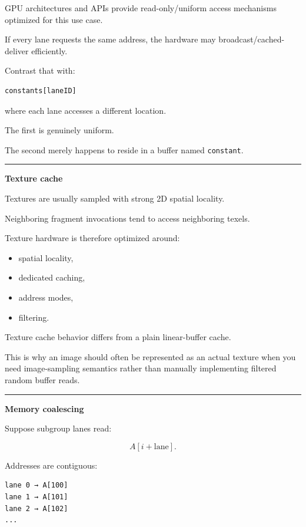 GPU architectures and APIs provide read-only/uniform access mechanisms optimized for this use case.

If every lane requests the same address, the hardware may broadcast/cached-deliver efficiently.

Contrast that with:

\protect{}\label{7e3tbt}%
\begin{verbatim}
constants[laneID]
\end{verbatim}

where each lane accesses a different location.

The first is genuinely uniform.

The second merely happens to reside in a buffer named \texttt{constant}.

\begin{center}\rule{0.5\linewidth}{0.5pt}\end{center}

\textbf{Texture cache}

Textures are usually sampled with strong 2D spatial locality.

Neighboring fragment invocations tend to access neighboring texels.

Texture hardware is therefore optimized around:

\begin{itemize}
\tightlist
\item
  spatial locality,
\item
  dedicated caching,
\item
  address modes,
\item
  filtering.
\end{itemize}

Texture cache behavior differs from a plain linear-buffer cache.

This is why an image should often be represented as an actual texture when you need image-sampling semantics rather than manually implementing filtered random buffer reads.

\begin{center}\rule{0.5\linewidth}{0.5pt}\end{center}

\textbf{Memory coalescing}

Suppose subgroup lanes read:

\[
A[i+\text{lane}].
\]

Addresses are contiguous:

\protect{}\label{4d98r5}%
\begin{verbatim}
lane 0 → A[100]
lane 1 → A[101]
lane 2 → A[102]
...
\end{verbatim}

